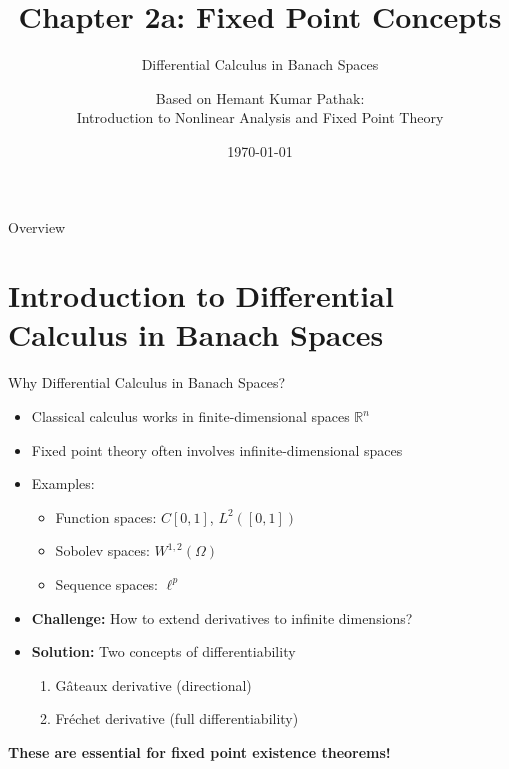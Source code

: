 \documentclass[aspectratio=169,10pt]{beamer}
\title[Ch 2a: Fixed Point Concepts]{Chapter 2a: Fixed Point Concepts}
\subtitle{Differential Calculus in Banach Spaces}
\author{Based on Hemant Kumar Pathak: \\ Introduction to Nonlinear Analysis and Fixed Point Theory}
\date{\today}
\begin{document}
\frame{\titlepage}


\begin{frame}[allowframebreaks]{Overview}
  \tableofcontents
\end{frame}


\section{Introduction to Differential Calculus in Banach Spaces}

\begin{frame}{Why Differential Calculus in Banach Spaces?}
  \begin{itemize}
    \item Classical calculus works in finite-dimensional spaces $\mathbb{R}^n$
    \item Fixed point theory often involves infinite-dimensional spaces
    \item Examples:
      \begin{itemize}
        \item Function spaces: $C[0,1]$, $L^2([0,1])$
        \item Sobolev spaces: $W^{1,2}(\Omega)$
        \item Sequence spaces: $\ell^p$
      \end{itemize}

    \item \textbf{Challenge:} How to extend derivatives to infinite dimensions?

    \item \textbf{Solution:} Two concepts of differentiability
      \begin{enumerate}
        \item Gâteaux derivative (directional)
        \item Fréchet derivative (full differentiability)
      \end{enumerate}
  \end{itemize}

  \vspace{0.5cm}
  \begin{center}
    \textbf{These are essential for fixed point existence theorems!}
  \end{center}
\end{frame}
\end{document}
